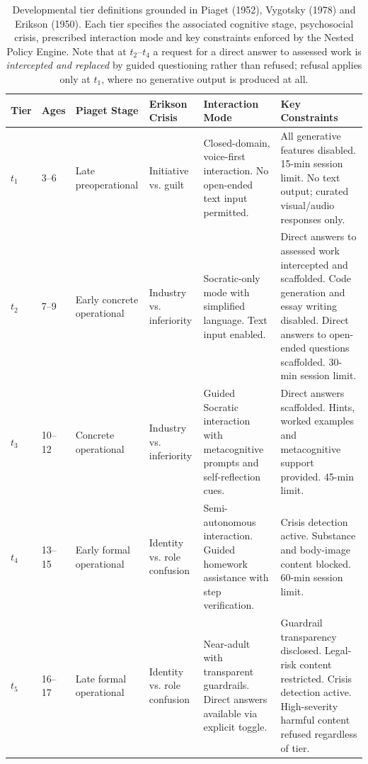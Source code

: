 \documentclass[fleqn,10pt]{wlscirep}
\begin{document}
\begin{table}[H]
\centering
\caption{Developmental tier definitions grounded in Piaget (1952), Vygotsky (1978) and Erikson (1950). Each tier specifies the associated cognitive stage, psychosocial crisis, prescribed interaction mode and key constraints enforced by the Nested Policy Engine. Note that at $t_2$--$t_4$ a request for a direct answer to assessed work is \emph{intercepted and replaced} by guided questioning rather than refused; refusal applies only at $t_1$, where no generative output is produced at all.}
\label{tab:tiers}
\small
\begin{tabular}{p{0.6cm}p{0.8cm}p{1.8cm}p{1.8cm}p{3.5cm}p{4cm}}
\hline
\textbf{Tier} & \textbf{Ages} & \textbf{Piaget Stage} & \textbf{Erikson Crisis} & \textbf{Interaction Mode} & \textbf{Key Constraints} \\
\hline
$t_1$ & 3--6 & Late preoperational & Initiative vs. guilt & Closed-domain, voice-first interaction. No open-ended text input permitted. & All generative features disabled. 15-min session limit. No text output; curated visual/audio responses only. \\
\hline
$t_2$ & 7--9 & Early concrete operational & Industry vs. inferiority & Socratic-only mode with simplified language. Text input enabled. & Direct answers to assessed work intercepted and scaffolded. Code generation and essay writing disabled. Direct answers to open-ended questions scaffolded. 30-min session limit. \\
\hline
$t_3$ & 10--12 & Concrete operational & Industry vs. inferiority & Guided Socratic interaction with metacognitive prompts and self-reflection cues. & Direct answers scaffolded. Hints, worked examples and metacognitive support provided. 45-min limit. \\
\hline
$t_4$ & 13--15 & Early formal operational & Identity vs. role confusion & Semi-autonomous interaction. Guided homework assistance with step verification. & Crisis detection active. Substance and body-image content blocked. 60-min session limit. \\
\hline
$t_5$ & 16--17 & Late formal operational & Identity vs. role confusion & Near-adult with transparent guardrails. Direct answers available via explicit toggle. & Guardrail transparency disclosed. Legal-risk content restricted. Crisis detection active. High-severity harmful content refused regardless of tier. \\
\hline
\end{tabular}
\end{table}
\end{document}
